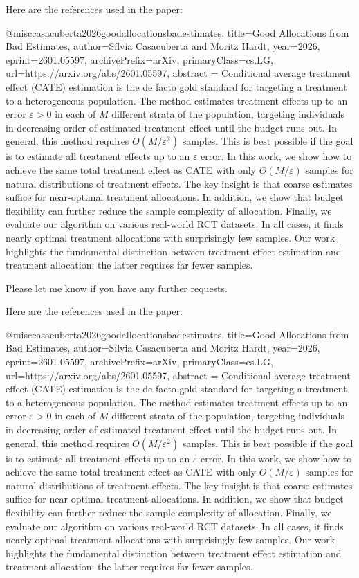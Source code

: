 Here are the references used in the paper:

@misc{casacuberta2026goodallocationsbadestimates,
      title={Good Allocations from Bad Estimates}, 
      author={Sílvia Casacuberta and Moritz Hardt},
      year={2026},
      eprint={2601.05597},
      archivePrefix={arXiv},
      primaryClass={cs.LG},
      url={https://arxiv.org/abs/2601.05597},
      abstract = {Conditional average treatment effect (CATE) estimation is the de facto gold standard for targeting a treatment to a heterogeneous population. The method estimates treatment effects up to an error $ε> 0$ in each of $M$ different strata of the population, targeting individuals in decreasing order of estimated treatment effect until the budget runs out. In general, this method requires $O(M/ε^2)$ samples. This is best possible if the goal is to estimate all treatment effects up to an $ε$ error. In this work, we show how to achieve the same total treatment effect as CATE with only $O(M/ε)$ samples for natural distributions of treatment effects. The key insight is that coarse estimates suffice for near-optimal treatment allocations. In addition, we show that budget flexibility can further reduce the sample complexity of allocation. Finally, we evaluate our algorithm on various real-world RCT datasets. In all cases, it finds nearly optimal treatment allocations with surprisingly few samples. Our work highlights the fundamental distinction between treatment effect estimation and treatment allocation: the latter requires far fewer samples.}
} 

Please let me know if you have any further requests. 

Here are the references used in the paper:

@misc{casacuberta2026goodallocationsbadestimates,
      title={Good Allocations from Bad Estimates}, 
      author={Sílvia Casacuberta and Moritz Hardt},
      year={2026},
      eprint={2601.05597},
      archivePrefix={arXiv},
      primaryClass={cs.LG},
      url={https://arxiv.org/abs/2601.05597},
      abstract = {Conditional average treatment effect (CATE) estimation is the de facto gold standard for targeting a treatment to a heterogeneous population. The method estimates treatment effects up to an error $ε> 0$ in each of $M$ different strata of the population, targeting individuals in decreasing order of estimated treatment effect until the budget runs out. In general, this method requires $O(M/ε^2)$ samples. This is best possible if the goal is to estimate all treatment effects up to an $ε$ error. In this work, we show how to achieve the same total treatment effect as CATE with only $O(M/ε)$ samples for natural distributions of treatment effects. The key insight is that coarse estimates suffice for near-optimal treatment allocations. In addition, we show that budget flexibility can further reduce the sample complexity of allocation. Finally, we evaluate our algorithm on various real-world RCT datasets. In all cases, it finds nearly optimal treatment allocations with surprisingly few samples. Our work highlights the fundamental distinction between treatment effect estimation and treatment allocation: the latter requires far fewer samples.}
} 

